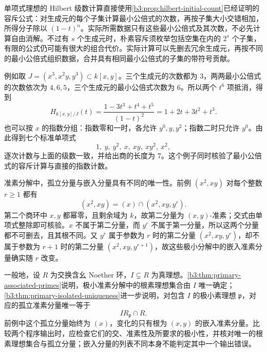 \begin{remark}\label{b3:prop:B-monomial-hilbert}
	单项式理想的 Hilbert 级数计算直接使用\cref{b3:prop:hilbert-initial-count}已经证明的容斥公式：对生成元的每个子集计算最小公倍式的次数，再按子集大小交错相加，所得分子除以 \((1-t)^n\)。实际所需数据只有这些最小公倍式及其次数，不必先计算自由消解。不过有 \(s\) 个生成元时，朴素容斥须枚举包括空集在内的 \(2^s\) 个子集，有限的公式仍可能有很大的组合代价。实际计算可以先删去冗余生成元，再按不同的最小公倍式组织数据，合并具有相同最小公倍式的子集的带符号贡献。
\end{remark}

例如取 \(J=(x^3,x^2y,y^3)\subset k[x,y]\)。三个生成元的次数都为 \(3\)，两两最小公倍式的次数依次为 \(4,6,5\)，三个生成元的最小公倍式次数为 \(6\)。所以两个 \(t^6\) 项抵消，得到
\[
	H_{k[x,y]/J}(t) =\frac{1-3t^3+t^4+t^5}{(1-t)^2} =1+2t+3t^2+t^3.
\]
也可以按 \(x\) 的指数分组：指数零和一时，各允许 \(y^0,y,y^2\)；指数二时只允许 \(y^0\)。由此得到七个标准单项式
\[
	1,\ y,\ y^2,\ x,\ xy,\ xy^2,\ x^2,
\]
逐次计数与上面的级数一致，并给出商的长度为 \(7\)。这个例子同时核验了最小公倍式的容斥计算与直接的指数计数。

\ProseParagraphBreak
准素分解中，孤立分量与嵌入分量具有不同的唯一性。前例 \((x^2,xy)\) 对每个整数 \(r\ge1\) 都有
\[
	(x^2,xy)=(x)\cap(x^2,xy,y^r).
\]
第二个商环中 \(x,y\) 都幂零，且剩余域为 \(k\)，故第二分量为 \((x,y)\)-准素；交式由单项式整除即可核验。\(x\) 不属于第二分量，而 \(y^r\) 不属于第一分量，所以这两个分量都不可删去，且其根不同。又 \(y^r\) 属于参数为 \(r\) 时的第二分量 \((x^2,xy,y^r)\)，却不属于参数为 \(r+1\) 时的第二分量 \((x^2,xy,y^{r+1})\)，故这些极小分解中的嵌入准素分量确实随 \(r\) 改变。

\ProseParagraphBreak
一般地，设 \(R\) 为交换含幺 Noether 环，\(I\subsetneq R\) 为真理想。\cref{b3:thm:primary-associated-primes}说明，极小准素分解中的根素理想集合由 \(I\) 唯一确定；\cref{b3:thm:primary-isolated-uniqueness}进一步说明，对包含 \(I\) 的极小素理想 \(\mathfrak p\)，对应的孤立准素分量唯一等于
\[
	IR_{\mathfrak p}\cap R.
\]
前例中这个孤立分量始终为 \((x)\)，变化的只有根为 \((x,y)\) 的嵌入准素分量。比较两个程序输出时，应检查它们的交、准素性及所要求的极小性，并核对唯一的根素理想集合与孤立分量；嵌入分量的列表不同本身不能判定其中一个输出错误。

